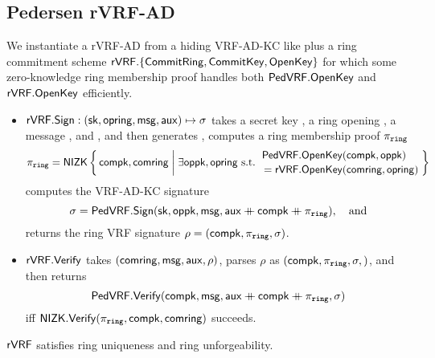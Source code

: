 
\subsection{Pedersen rVRF-AD}

We instantiate a rVRF-AD from a hiding VRF-AD-KC like \PedVRF plus
a ring commitment scheme
 ${\mathsf{rVRF}}.\{ {\mathsf{CommitRing}}, {\mathsf{CommitKey}}, {\mathsf{OpenKey}} \}$
for which some zero-knowledge ring membership proof handles both
 ${\mathsf{PedVRF}}.{\mathsf{OpenKey}}$ and ${\mathsf{rVRF}}.{\mathsf{OpenKey}}$
efficiently.

\begin{itemize}
\item ${\mathsf{rVRF}}.{\mathsf{Sign}} : (\mathsf{sk},\mathsf{opring},\mathsf{msg},\mathsf{aux}) \mapsto \sigma$ takes
 a secret key \sk, a ring opening \openring, a message \msg, and \aux, and then %
 generates \openpk, computes a ring membership proof $\piring$
  $$ \piring = \NIZK \Setst{ \compk, \comring }{
  \exists \openpk,\openring \textrm{\ s.t.\ } 
  \genfrac{}{}{0pt}{}{\PedVRF.\OpenKey(\compk,\openpk) \quad}{\,\, = \rVRF.\OpenKey(\comring,\openring)}
  } $$
 computes the VRF-AD-KC signature
  $$ \sigma = {\mathsf{PedVRF}}.{\mathsf{Sign}}(\mathsf{sk},\mathsf{oppk},\mathsf{msg},\mathsf{aux} \mathbin{+\mkern-10mu+} \mathsf{compk} \mathbin{+\mkern-10mu+} \pi_{\mathtt{ring}}), \quad\textrm{and} $$ %
 returns the ring VRF signature $\rho = (\mathsf{compk},\pi_{\mathtt{ring}},\sigma)$.
\item ${\mathsf{rVRF}}.{\mathsf{Verify}}$ takes $(\mathsf{comring},\mathsf{msg},\mathsf{aux},\rho)$,
 parses $\rho$ as $(\mathsf{compk},\pi_{\mathtt{ring}},\sigma,)$,  and then returns
 $$ {\mathsf{PedVRF}}.{\mathsf{Verify}}(\mathsf{compk},\mathsf{msg},\mathsf{aux} \mathbin{+\mkern-10mu+} \mathsf{compk} \mathbin{+\mkern-10mu+} \pi_{\mathtt{ring}},\sigma) $$
 iff ${\mathsf{NIZK}}.{\mathsf{Verify}}(\pi_{\mathtt{ring}},\mathsf{compk},\mathsf{comring})$ succeeds. 
\end{itemize}

\begin{proposition}\label{prop:pedersen_rvrf}
${\mathsf{rVRF}}$ satisfies ring uniqueness and ring unforgeability.
\end{proposition}







\endinput










In this, we tie $\sigma$ to $\piring$ by expanding $\sigma$'s auxiliary data with $\piring$.

